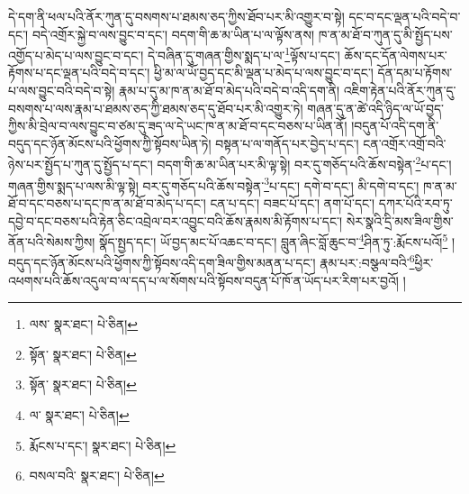 དེ་དག་ནི་ཕལ་པའི་ནོར་ཀུན་དུ་བསགས་པ་ཐམས་ཅད་ཀྱིས་ཐོབ་པར་མི་འགྱུར་བ་སྟེ། དང་བ་དང་ལྡན་པའི་བདེ་བ་དང་། བདེ་འགྲོར་སྐྱེ་བ་ལས་བྱུང་བ་དང་། བདག་གི་ཆ་མ་ཡིན་པ་ལ་ལྟོས་ནས། ཁ་ན་མ་ཐོ་བ་ཀུན་དུ་མི་སྤྱོད་པས་འགྱོད་པ་མེད་པ་ལས་བྱུང་བ་དང་། དེ་བཞིན་དུ་གཞན་གྱིས་སྨད་པ་ལ་\footnote{ལས་  སྣར་ཐང་།  པེ་ཅིན། }ལྟོས་པ་དང་། ཆོས་དང་དོན་ལེགས་པར་རྟོགས་པ་དང་ལྡན་པའི་བདེ་བ་དང་། ཕྱི་མ་ལ་ཡོ་བྱད་དང་མི་ལྡན་པ་མེད་པ་ལས་བྱུང་བ་དང་། དོན་དམ་པ་རྟོགས་པ་ལས་བྱུང་བའི་བདེ་བ་སྟེ། རྣམ་པ་དུ་མ་ཁ་ན་མ་ཐོ་བ་མེད་པའི་བདེ་བ་འདི་དག་ནི། འཇིག་རྟེན་པའི་ནོར་ཀུན་དུ་བསགས་པ་ལས་རྣམ་པ་ཐམས་ཅད་ཀྱི་ཐམས་ཅད་དུ་ཐོབ་པར་མི་འགྱུར་ཏེ། གཞན་དུ་ན་ཚེ་འདི་ཉིད་ལ་ཡོ་བྱད་ཀྱིས་མི་བྲེལ་བ་ལས་བྱུང་བ་ཙམ་དུ་ཟད་ལ་དེ་ཡང་ཁ་ན་མ་ཐོ་བ་དང་བཅས་པ་ཡིན་ནོ། །བདུན་པོ་འདི་དག་ནི་བདུད་དང་ཉོན་མོངས་པའི་ཕྱོགས་ཀྱི་སྟོབས་ཡིན་ཏེ། བསྟན་པ་ལ་གནོད་པར་བྱེད་པ་དང་། ངན་འགྲོར་འགྲོ་བའི་ཉེས་པར་སྤྱོད་པ་ཀུན་དུ་སྤྱོད་པ་དང་། བདག་གི་ཆ་མ་ཡིན་པར་མི་ལྟ་སྟེ། བར་དུ་གཅོད་པའི་ཆོས་བསྟེན་\footnote{སྟོན་  སྣར་ཐང་།  པེ་ཅིན། }པ་དང་། གཞན་གྱིས་སྨད་པ་ལས་མི་ལྟ་སྟེ། བར་དུ་གཅོད་པའི་ཆོས་བསྟེན་\footnote{སྟོན་  སྣར་ཐང་།  པེ་ཅིན། }པ་དང་། དགེ་བ་དང་། མི་དགེ་བ་དང་། ཁ་ན་མ་ཐོ་བ་དང་བཅས་པ་དང་ཁ་ན་མ་ཐོ་བ་མེད་པ་དང་། ངན་པ་དང་། བཟང་པོ་དང་། ནག་པོ་དང་། དཀར་པོའི་རབ་ཏུ་དབྱེ་བ་དང་བཅས་པའི་རྟེན་ཅིང་འབྲེལ་བར་འབྱུང་བའི་ཆོས་རྣམས་མི་རྟོགས་པ་དང་། སེར་སྣའི་དྲི་མས་ཟིལ་གྱིས་ནོན་པའི་སེམས་ཀྱིས། སྣོད་སྤྱད་དང་། ཡོ་བྱད་མང་པོ་འཆང་བ་དང་། བླུན་ཞིང་བློ་ཆུང་བ་\footnote{ལ་  སྣར་ཐང་།  པེ་ཅིན། }ཤིན་ཏུ་:རྨོངས་པའོ།\footnote{རྨོངས་པ་དང་།  སྣར་ཐང་།  པེ་ཅིན། } །བདུད་དང་ཉོན་མོངས་པའི་ཕྱོགས་ཀྱི་སྟོབས་འདི་དག་ཟིལ་གྱིས་མནན་པ་དང་། རྣམ་པར་:བསྩལ་བའི་\footnote{བསལ་བའི་  སྣར་ཐང་།  པེ་ཅིན། }ཕྱིར་འཕགས་པའི་ཆོས་འདུལ་བ་ལ་དད་པ་ལ་སོགས་པའི་སྟོབས་བདུན་པོ་ཁོ་ན་ཡོད་པར་རིག་པར་བྱའོ། །

